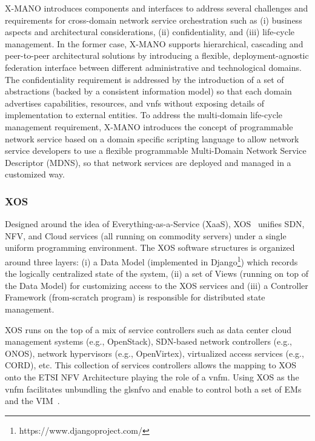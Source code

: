 X-MANO introduces components and interfaces to address several challenges and requirements for cross-domain network service orchestration such as (i) business aspects and architectural considerations, (ii) confidentiality, and (iii) life-cycle management. In the former case,  X-MANO supports hierarchical, cascading and peer-to-peer architectural solutions by introducing a flexible, deployment-agnostic federation interface between different administrative and technological domains. The confidentiality requirement is addressed by the introduction of a set of abstractions (backed by a consistent information model) so that each domain advertises capabilities, resources, and \glspl{vnf} without exposing details of implementation to external entities. To address the multi-domain life-cycle management requirement, X-MANO introduces the concept of programmable network service based on a domain specific scripting language to allow network service developers to use a flexible programmable Multi-Domain Network Service Descriptor (MDNS), so that network services are deployed and managed in a customized way.

\subsubsection{XOS}
Designed around the idea of Everything-as-a-Service (XaaS), XOS~\cite{peterson2015xos} unifies SDN, NFV, and Cloud services (all running on commodity servers) under a single uniform programming environment. The XOS software structures is organized around three layers: (i) a Data Model (implemented in Django\footnote{https://www.djangoproject.com/}) which records the logically centralized state of the system, (ii) a set of Views (running on top of the Data Model) for customizing access to the XOS services and (iii) a Controller Framework (from-scratch program) is responsible for distributed state management. 

XOS runs on the top of a mix of service controllers such as data center cloud management systems (e.g., OpenStack), SDN-based network controllers (e.g., ONOS), network hypervisors (e.g., OpenVirtex), virtualized access services (e.g., CORD), etc. This collection of services controllers allows the mapping to XOS onto the ETSI NFV Architecture playing the role of a \gls{vnfm}. Using XOS as the \gls{vnfm} facilitates unbundling the gls{nfvo} and enable to control both a set of EMs and the VIM~\cite{xos}.

